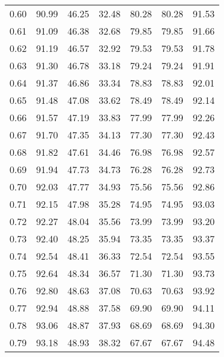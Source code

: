 \begin{tabular}{|c|c|c|c|c|c|c|}
      0.60 &     90.99 &     46.25 &      32.48 &   80.28 &      80.28 &         91.53 \\
      0.61 &     91.09 &     46.38 &      32.68 &   79.85 &      79.85 &         91.66 \\
      0.62 &     91.19 &     46.57 &      32.92 &   79.53 &      79.53 &         91.78 \\
      0.63 &     91.30 &     46.78 &      33.18 &   79.24 &      79.24 &         91.91 \\
      0.64 &     91.37 &     46.86 &      33.34 &   78.83 &      78.83 &         92.01 \\
      0.65 &     91.48 &     47.08 &      33.62 &   78.49 &      78.49 &         92.14 \\
      0.66 &     91.57 &     47.19 &      33.83 &   77.99 &      77.99 &         92.26 \\
      0.67 &     91.70 &     47.35 &      34.13 &   77.30 &      77.30 &         92.43 \\
      0.68 &     91.82 &     47.61 &      34.46 &   76.98 &      76.98 &         92.57 \\
      0.69 &     91.94 &     47.73 &      34.73 &   76.28 &      76.28 &         92.73 \\
      0.70 &     92.03 &     47.77 &      34.93 &   75.56 &      75.56 &         92.86 \\
      0.71 &     92.15 &     47.98 &      35.28 &   74.95 &      74.95 &         93.03 \\
      0.72 &     92.27 &     48.04 &      35.56 &   73.99 &      73.99 &         93.20 \\
      0.73 &     92.40 &     48.25 &      35.94 &   73.35 &      73.35 &         93.37 \\
      0.74 &     92.54 &     48.41 &      36.33 &   72.54 &      72.54 &         93.55 \\
      0.75 &     92.64 &     48.34 &      36.57 &   71.30 &      71.30 &         93.73 \\
      0.76 &     92.80 &     48.63 &      37.08 &   70.63 &      70.63 &         93.92 \\
      0.77 &     92.94 &     48.88 &      37.58 &   69.90 &      69.90 &         94.11 \\
      0.78 &     93.06 &     48.87 &      37.93 &   68.69 &      68.69 &         94.30 \\
      0.79 &     93.18 &     48.93 &      38.32 &   67.67 &      67.67 &         94.48 \\

\end{tabular}
